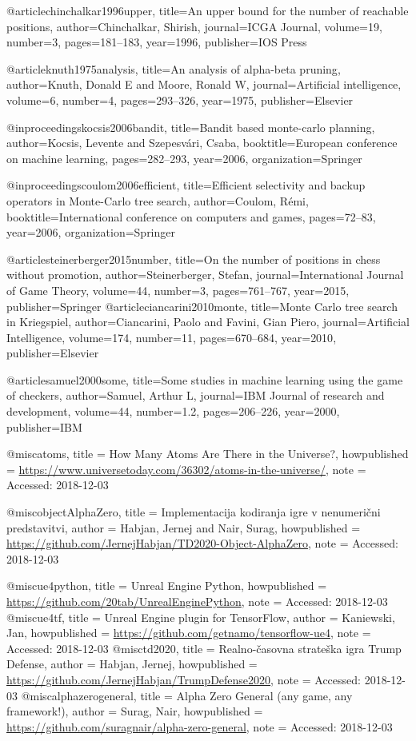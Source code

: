 
 @article{chinchalkar1996upper,
  title={An upper bound for the number of reachable positions},
  author={Chinchalkar, Shirish},
  journal={ICGA Journal},
  volume={19},
  number={3},
  pages={181--183},
  year={1996},
  publisher={IOS Press}
}

@article{knuth1975analysis,
  title={An analysis of alpha-beta pruning},
  author={Knuth, Donald E and Moore, Ronald W},
  journal={Artificial intelligence},
  volume={6},
  number={4},
  pages={293--326},
  year={1975},
  publisher={Elsevier}
}

@inproceedings{kocsis2006bandit,
  title={Bandit based monte-carlo planning},
  author={Kocsis, Levente and Szepesv{\'a}ri, Csaba},
  booktitle={European conference on machine learning},
  pages={282--293},
  year={2006},
  organization={Springer}
}

@inproceedings{coulom2006efficient,
  title={Efficient selectivity and backup operators in Monte-Carlo tree search},
  author={Coulom, R{\'e}mi},
  booktitle={International conference on computers and games},
  pages={72--83},
  year={2006},
  organization={Springer}
}

@article{steinerberger2015number,
  title={On the number of positions in chess without promotion},
  author={Steinerberger, Stefan},
  journal={International Journal of Game Theory},
  volume={44},
  number={3},
  pages={761--767},
  year={2015},
  publisher={Springer}
}
@article{ciancarini2010monte,
  title={Monte Carlo tree search in Kriegspiel},
  author={Ciancarini, Paolo and Favini, Gian Piero},
  journal={Artificial Intelligence},
  volume={174},
  number={11},
  pages={670--684},
  year={2010},
  publisher={Elsevier}
}


@article{samuel2000some,
  title={Some studies in machine learning using the game of checkers},
  author={Samuel, Arthur L},
  journal={IBM Journal of research and development},
  volume={44},
  number={1.2},
  pages={206--226},
  year={2000},
  publisher={IBM}
}

 @misc{atoms,
  title = {How Many Atoms Are There in the Universe?},
  howpublished = {\url{https://www.universetoday.com/36302/atoms-in-the-universe/}},
  note = {Accessed: 2018-12-03}
}

@misc{objectAlphaZero,
  title = {Implementacija kodiranja igre v nenumerični predstavitvi},
author = {Habjan, Jernej and Nair, Surag},
  howpublished = {\url{https://github.com/JernejHabjan/TD2020-Object-AlphaZero}},
  note = {Accessed: 2018-12-03}
}

@misc{ue4python,
  title = {Unreal Engine Python},
  howpublished = {\url{https://github.com/20tab/UnrealEnginePython}},
  note = {Accessed: 2018-12-03}
}
@misc{ue4tf,
  title = {Unreal Engine plugin for TensorFlow},
author = {Kaniewski, Jan},
  howpublished = {\url{https://github.com/getnamo/tensorflow-ue4}},
  note = {Accessed: 2018-12-03}
}
@misc{td2020,
  title = {Realno-časovna strateška igra Trump Defense},
author = {Habjan, Jernej},
  howpublished = {\url{https://github.com/JernejHabjan/TrumpDefense2020}},
  note = {Accessed: 2018-12-03}
}
@misc{alphazerogeneral,
  title = {Alpha Zero General (any game, any framework!)},
author = {Surag, Nair},
  howpublished = {\url{https://github.com/suragnair/alpha-zero-general}},
  note = {Accessed: 2018-12-03}
}

